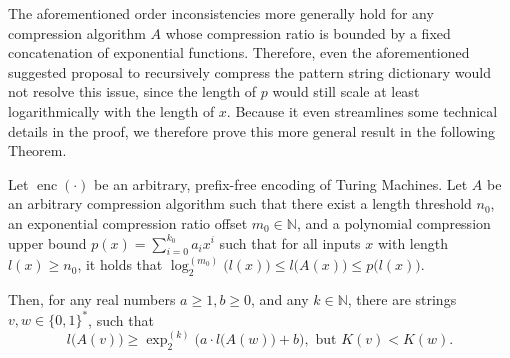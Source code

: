The aforementioned order inconsistencies more generally hold for any compression algorithm $A$ whose compression ratio is bounded by a fixed concatenation of exponential functions.
Therefore, even the aforementioned suggested proposal to recursively compress the pattern string dictionary would not resolve this issue, since the length of $p$ would still scale at least logarithmically with the length of $x$.
Because it even streamlines some technical details in the proof, we therefore prove this more general result in the following Theorem.
\begin{theorem}
	\label{theorem:unbounded-order-inconsistencies-from-lzw-to-kolmogorov}
	Let $\operatorname{enc}(\cdot)$ be an arbitrary, prefix-free encoding of Turing Machines.
	Let $A$ be an arbitrary compression algorithm such that there exist a length threshold $n_0$, an exponential compression ratio offset $m_0\in\mathbb{N}$, and a polynomial compression upper bound $p(x)=\sum_{i=0}^{k_0}a_ix^i$ such that for all inputs $x$ with length $l(x)\geq n_0$, it holds that $\log_2^{(m_0)}\bigl(l(x)\bigr) \leq l\bigl(A(x)\bigr)\leq p\bigl(l(x)\bigr)$.
	
	Then, for any real numbers $a\geq 1,b\geq 0$, and any $k\in\mathbb{N}$,
	there are strings $v,w\in\{0,1\}^{*}$, such that
	\begin{equation}
		l\bigl(A(v)\bigr)\geq \exp_2^{(k)}\bigl(a\cdot l\bigl( A(w)\bigr) + b\bigr), \text{ but } K(v) < K(w).
	\end{equation}
\end{theorem}
